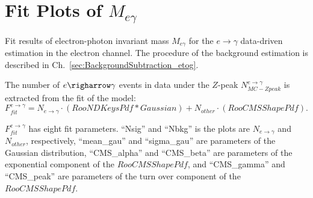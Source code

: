 \chapter{Fit Plots of $M_{e\gamma}$}
\label{sec:EtogammaFitPlots}

Fit results of electron-photon invariant mass $M_{e\gamma}$ for the $e \rightarrow \gamma$ data-driven estimation in the electron channel. The procedure of the background estimation is described in Ch.~\ref{sec:BackgroundSubtraction_etog}.

The number of $e\righarrow\gamma$ events in data under the $Z$-peak $N_{MC-Zpeak}^{e\rightarrow\gamma}$ is extracted from the fit of the model: 
\begin{equation}
F_{fit}^{e\rightarrow\gamma} = N_{e\rightarrow\gamma} \cdot (RooNDKeysPdf \ast Gaussian) +  N_{other} \cdot (RooCMSShapePdf).
\end{equation}

$F_{fit}^{e\rightarrow\gamma}$ has eight fit parameters. ``Nsig'' and ``Nbkg'' is the plots are $N_{e\rightarrow\gamma}$ and $N_{other}$, respectively, ``mean\_gau'' and ``sigma\_gau'' are parameters of the Gaussian distribution, ``CMS\_alpha'' and ``CMS\_beta'' are parameters of the exponential component of the $RooCMSShapePdf$, and ``CMS\_gamma'' and ``CMS\_peak'' are parameters of the turn over component of the $RooCMSShapePdf$.  

